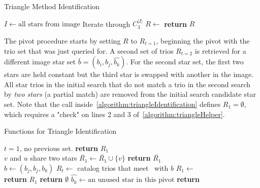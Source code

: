 \begin{algorithm}
    \caption{Triangle Method Identification} \label{algorithm:triangleIdentification}
    \begin{algorithmic}[1]
        \State $I \gets \text{all stars} \text{ from image}$
          \Comment Iterate through $C^{|I|}_3$
        \State $R \gets$ 
        \State \textbf{return} $R$
        \EndIf
        \EndFor
        \EndFor
        \EndFor
        \EndProcedure
    \end{algorithmic}
\end{algorithm}

The pivot procedure starts by setting $R$ to $R_{t=1}$, beginning the pivot with the trio set that was just queried
for.
A second set of trios $R_{t=2}$ is retrieved for a different image star set $\bar{b} = (b_i, b_j, \hat{b_k})$.
For the second star set, the first two stars are held constant but the third star is swapped with another in the image.
All star trios in the initial search that do not match a trio in the second search by \textit{two stars} (a partial
match) are removed from the initial search candidate star set.
Note that the  call inside~\autoref{algorithm:triangleIdentification}
defines $R_1 = \emptyset$, which requires a "check" on lines 2 and 3 of~\autoref{algorithm:triangleHelper}.

\begin{algorithm}
    \caption{Functions for Triangle Identification} \label{algorithm:triangleHelper}
    \begin{algorithmic}[1]
         \Comment $t = 1$, no previous set.
        \State \textbf{return} $R_1$
        \EndIf
        \\
        \LineComment $v$ and $u$ share two stars
        \State $\bar{R_1} \gets \bar{R_1} \cup \{v\}$
        \EndIf
        \EndFor
        \State \textbf{return} $\bar{R_1}$
        \EndFunction
        \\
        \State $b \gets (b_j, b_j, b_k)$
        \State $R_t \gets $ catalog trios that meet~ with $b$
        \State $R_1 \gets $ 
        \\
        \State \textbf{return} $R_1$
        \State \textbf{return} $\emptyset$
        \Else
        \State $\hat{b_k} \gets \text{an unused star in this pivot}$
        \State \textbf{return} 
        \EndIf
        \EndFunction
    \end{algorithmic}
\end{algorithm}

